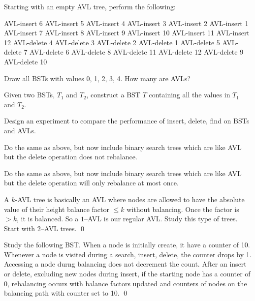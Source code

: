 \begin{ex}
  Starting with an empty AVL tree, perform the following:
  \begin{tightlist}
    \li AVL-insert 6
    \li AVL-insert 5
    \li AVL-insert 4
    \li AVL-insert 3
    \li AVL-insert 2
    \li AVL-insert 1
    \li AVL-insert 7
    \li AVL-insert 8
    \li AVL-insert 9
    \li AVL-insert 10
    \li AVL-insert 11
    \li AVL-insert 12
    \li AVL-delete 4
    \li AVL-delete 3
    \li AVL-delete 2
    \li AVL-delete 1
    \li AVL-delete 5
    \li AVL-delete 7
    \li AVL-delete 6
    \li AVL-delete 8
    \li AVL-delete 11
    \li AVL-delete 12
    \li AVL-delete 9
    \li AVL-delete 10
  \end{tightlist}
\end{ex}


\begin{ex}
  Draw all BSTs with values 0, 1, 2, 3, 4.
  How many are AVLs?
\end{ex}



\begin{ex} [Merge]
  Given two BSTs, $T_1$ and $T_2$, construct a BST $T$ containing all the values in
  $T_1$ and $T_2$.
\end{ex}


\begin{ex}
  \begin{tightlist}
  \item Design an experiment to compare the performance of insert, delete, find
  on BSTs and AVLs.
  \item Do the same as above, but now include binary search trees which
  are like AVL but the delete operation does not rebalance.
  \item Do the same as above, but now include binary search trees which
  are like AVL but the delete operation will only rebalance at most once.
  \end{tightlist}
\end{ex}
  


\begin{ex}
  A $k$-AVL tree is basically an AVL where
   nodes are allowed to have the
  absolute value of their height balance factor
  $\leq k$ without balancing.
  Once the factor is $> k$, it is balanced.
  So a $1$--AVL is our regular AVL.
  Study this type of trees. Start with $2$--AVL trees.
  \qed \end{ex}


\begin{ex}
  Study the following BST.
  When a node is initially create, it have a counter of 10.
  Whenever a node is visited during a search, insert, delete,
  the counter drops by 1.
  Accessing a node durng balancing does not decrement the count.
  After an insert or delete, excluding new nodes during insert,
  if the starting node has a counter of 0,
  rebalancing occurs with balance factors updated and counters of
  nodes on the balancing path with counter set to 10.
  \qed
\end{ex}
